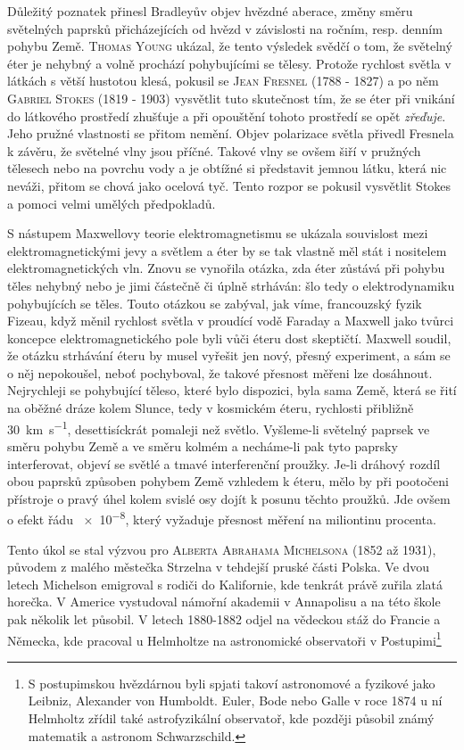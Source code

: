         Důležitý poznatek přinesl Bradleyův objev hvězdné aberace, změny směru světelných paprsků
        přicházejících od hvězd v závislosti na ročním, resp. denním pohybu Země. \textsc{Thomas
        Young} ukázal, že tento výsledek svědčí o tom, že světelný éter je nehybný a volně prochází
        pohybujícími se tělesy. Protože rychlost světla v látkách s větší hustotou klesá, pokusil se
        \textsc{Jean Fresnel} (1788 - 1827) a po něm \textsc{Gabriel Stokes} (1819 - 1903) vysvětlit
        tuto skutečnost tím, že se éter při vnikání do látkového prostředí zhušťuje a při opouštění
        tohoto prostředí se opět \emph{zřeďuje}. Jeho pružné vlastnosti se přitom nemění. Objev
        polarizace světla přivedl Fresnela k závěru, že světelné vlny jsou příčné. Takové vlny se
        ovšem šiří v pružných tělesech nebo na povrchu vody a je obtížné si představit jemnou látku,
        která nic neváži, přitom se chová jako ocelová tyč. Tento rozpor se pokusil vysvětlit Stokes
        a pomoci velmi umělých předpokladů.

      S nástupem Maxwellovy teorie elektromagnetismu se ukázala souvislost mezi elektromagnetickými
      jevy a světlem a éter by se tak vlastně měl stát i nositelem elektromagnetických vln. Znovu se
      vynořila otázka, zda éter zůstává při pohybu těles nehybný nebo je jimi částečně či úplně
      strháván: šlo tedy o elektrodynamiku pohybujících se těles. Touto otázkou se zabýval, jak
      víme, francouzský fyzik Fizeau, když měnil rychlost světla v proudící vodě Faraday a Maxwell
      jako tvůrci koncepce elektromagnetického pole byli vůči éteru dost skeptičtí. Maxwell soudil,
      že otázku strhávání éteru by musel vyřešit jen nový, přesný experiment, a sám se o něj
      nepokoušel, neboť pochyboval, že takové přesnost měřeni lze dosáhnout. Nejrychleji se
      pohybující těleso, které bylo dispozici, byla sama Země, která se řití na oběžné dráze kolem
      Slunce, tedy v kosmickém éteru, rychlosti přibližně \SI{30}{\km\per\s}, desettisíckrát
      pomaleji než světlo. Vyšleme-li světelný paprsek ve směru pohybu Země a ve směru kolmém a
      necháme-li pak tyto paprsky interferovat, objeví se světlé a tmavé interferenční proužky.
      Je-li dráhový rozdíl obou paprsků způsoben pohybem Země vzhledem k éteru, mělo by při
      pootočeni přístroje o pravý úhel kolem svislé osy dojít k posunu těchto proužků. Jde ovšem o
      efekt řádu \num{e-8}, který vyžaduje přesnost měření na miliontinu procenta. 

      Tento úkol se stal výzvou pro \textsc{Alberta Abrahama Michelsona} (1852 až 1931), původem z
      malého městečka Strzelna v tehdejší pruské části Polska. Ve dvou letech Michelson emigroval s
      rodiči do Kalifornie, kde tenkrát právě zuřila zlatá horečka. V Americe vystudoval námořní
      akademii v Annapolisu a na této škole pak několik let působil. V letech 1880-1882 odjel na
      vědeckou stáž do Francie a Německa, kde pracoval u Helmholtze na astronomické observatoři v
      Postupimi\footnote{ S postupimskou hvězdárnou byli spjati takoví astronomové a fyzikové jako
      Leibniz, Alexander von Humboldt. Euler, Bode nebo Galle v roce 1874 u ní Helmholtz zřídil také
      astrofyzikální observatoř, kde později působil známý matematik a astronom Schwarzschild.}
        
